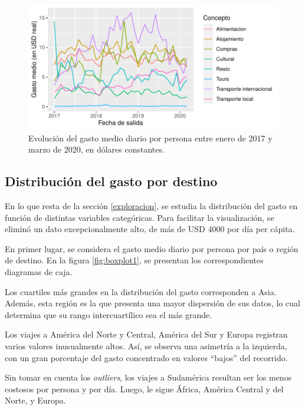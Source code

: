 \documentclass[
]{article}
\begin{document}
\begin{figure}[H]

{\centering \includegraphics{Informe-Proyectofinal_files/figure-latex/evolucion_constante-1} 

}

\caption{Evolución del gasto medio diario por persona entre enero de 2017 y marzo de 2020, en dólares constantes.}\label{fig:evolucion_constante}
\end{figure}

\hypertarget{distribuciuxf3n-del-gasto-por-destino}{%
\subsection{Distribución del gasto por
destino}\label{distribuciuxf3n-del-gasto-por-destino}}

En lo que resta de la sección \ref{exploracion}, se estudia la
distribución del gasto en función de distintas variables categóricas.
Para facilitar la visualización, se eliminó un dato excepcionalmente
alto, de más de USD 4000 por día per cápita.

En primer lugar, se considera el gasto medio diario por persona por país
o región de destino. En la figura \ref{fig:boxplot1}, se presentan los
correspondientes diagramas de caja.

Los cuartiles más grandes en la distribución del gasto corresponden a
Asia. Además, esta región es la que presenta una mayor dispersión de sus
datos, lo cual determina que su rango intercuartílico sea el más grande.

Los viajes a América del Norte y Central, América del Sur y Europa
registran varios valores inusualmente altos. Así, se observa una
asimetría a la izquierda, con un gran porcentaje del gasto concentrado
en valores ``bajos'' del recorrido.

Sin tomar en cuenta los \emph{outliers}, los viajes a Sudamérica
resultan ser los menos costosos por persona y por día. Luego, le sigue
África, América Central y del Norte, y Europa.
\end{document}
